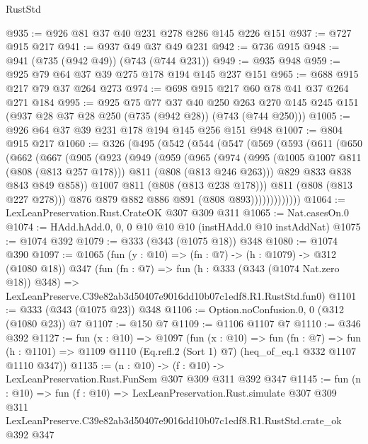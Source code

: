 \begin{lexlean}{RustStd}
\begin{coremodule}
@935 := @926 @81 @37 @40 @231 @278 @286 @145 @226 @151
@937 := @727 @915 @217
@941 := @937 @49 @37 @49 @231
@942 := @736 @915
@948 := @941 (@735 (@942 @49)) (@743 (@744 @231))
@949 := @935 @948
@959 := @925 @79 @64 @37 @39 @275 @178 @194 @145 @237 @151
@965 := @688 @915 @217 @79 @37 @264 @273
@974 := @698 @915 @217 @60 @78 @41 @37 @264 @271 @184
@995 := @925
    @75
    @77
    @37
    @40
    @250
    @263
    @270
    @145
    @245
    @151
    (@937 @28 @37 @28 @250 (@735 (@942 @28)) (@743 (@744 @250)))
@1005 := @926 @64 @37 @39 @231 @178 @194 @145 @256 @151 @948
@1007 := @804 @915 @217
@1060 := @326
    (@495
      (@542
        (@544
          (@547
            (@569
              (@593
                (@611
                  (@650
                    (@662
                      (@667
                        (@905
                          (@923
                            (@949
                              (@959
                                (@965
                                  (@974
                                    (@995
                                      (@1005 @1007 @811 (@808 (@813 @257 @178)))
                                      @811
                                      (@808 (@813 @246 @263)))
                                    @829
                                    @833
                                    @838
                                    @843
                                    @849
                                    @858))
                                @1007
                                @811
                                (@808 (@813 @238 @178)))
                              @811
                              (@808 (@813 @227 @278)))
                            @876
                            @879
                            @882
                            @886
                            @891
                            (@808 @893)))))))))))))
@1064 := LexLeanPreservation.Rust.CrateOK @307 @309 @311
@1065 := Nat.casesOn.{0}
@1074 := HAdd.hAdd.{0, 0, 0} @10 @10 @10 (instHAdd.{0} @10 instAddNat)
@1075 := @1074 @392
@1079 := @333 (@343 (@1075 @18)) @348
@1080 := @1074 @390
@1097 := @1065
    (fun (y : @10) => (fn : @7) -> (h : @1079) -> @312 (@1080 @18))
    @347
    (fun (fn : @7) =>
    fun (h : @333 (@343 (@1074 Nat.zero @18)) @348) =>
    LexLeanPreserve.C39e82ab3d50407e9016dd10b07c1edf8.R1.RustStd.fun0)
@1101 := @333 (@343 (@1075 @23)) @348
@1106 := Option.noConfusion.{0, 0} (@312 (@1080 @23)) @7
@1107 := @150 @7
@1109 := @1106 @1107 @7
@1110 := @346 @392
@1127 := fun (x : @10) =>
  @1097
    (fun (x : @10) =>
    fun (fn : @7) =>
    fun (h : @1101) => @1109 @1110 (Eq.refl.{2} (Sort 1) @7) (heq_of_eq.{1} @332 @1107 @1110 @347))
@1135 := (n : @10) -> (f : @10) -> LexLeanPreservation.Rust.FunSem @307 @309 @311 @392 @347
@1145 := fun (n : @10) =>
  fun (f : @10) =>
  LexLeanPreservation.Rust.simulate
    @307
    @309
    @311
    LexLeanPreserve.C39e82ab3d50407e9016dd10b07c1edf8.R1.RustStd.crate_ok
    @392
    @347
\end{coremodule}
\end{lexlean}
